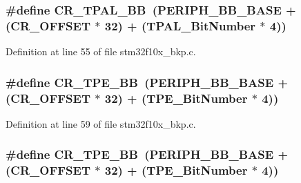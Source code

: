 \subsubsection[{\texorpdfstring{C\+R\+\_\+\+T\+P\+A\+L\+\_\+\+BB}{CR_TPAL_BB}}]{\setlength{\rightskip}{0pt plus 5cm}\#define C\+R\+\_\+\+T\+P\+A\+L\+\_\+\+BB~({\bf P\+E\+R\+I\+P\+H\+\_\+\+B\+B\+\_\+\+B\+A\+SE} + ({\bf C\+R\+\_\+\+O\+F\+F\+S\+ET} $\ast$ 32) + ({\bf T\+P\+A\+L\+\_\+\+Bit\+Number} $\ast$ 4))}\hypertarget{group___b_k_p___private___defines_gaa36e52f37b9fa6982bd224a6dcb86f78}{}\label{group___b_k_p___private___defines_gaa36e52f37b9fa6982bd224a6dcb86f78}


Definition at line 55 of file stm32f10x\+\_\+bkp.\+c.

\subsubsection[{\texorpdfstring{C\+R\+\_\+\+T\+P\+E\+\_\+\+BB}{CR_TPE_BB}}]{\setlength{\rightskip}{0pt plus 5cm}\#define C\+R\+\_\+\+T\+P\+E\+\_\+\+BB~({\bf P\+E\+R\+I\+P\+H\+\_\+\+B\+B\+\_\+\+B\+A\+SE} + ({\bf C\+R\+\_\+\+O\+F\+F\+S\+ET} $\ast$ 32) + ({\bf T\+P\+E\+\_\+\+Bit\+Number} $\ast$ 4))}\hypertarget{group___b_k_p___private___defines_ga6c11e801c2c1aa87ec2feaefe12bbb96}{}\label{group___b_k_p___private___defines_ga6c11e801c2c1aa87ec2feaefe12bbb96}


Definition at line 59 of file stm32f10x\+\_\+bkp.\+c.

\subsubsection[{\texorpdfstring{C\+R\+\_\+\+T\+P\+E\+\_\+\+BB}{CR_TPE_BB}}]{\setlength{\rightskip}{0pt plus 5cm}\#define C\+R\+\_\+\+T\+P\+E\+\_\+\+BB~({\bf P\+E\+R\+I\+P\+H\+\_\+\+B\+B\+\_\+\+B\+A\+SE} + ({\bf C\+R\+\_\+\+O\+F\+F\+S\+ET} $\ast$ 32) + ({\bf T\+P\+E\+\_\+\+Bit\+Number} $\ast$ 4))}\hypertarget{group___b_k_p___private___defines_ga6c11e801c2c1aa87ec2feaefe12bbb96}{}\label{group___b_k_p___private___defines_ga6c11e801c2c1aa87ec2feaefe12bbb96}


